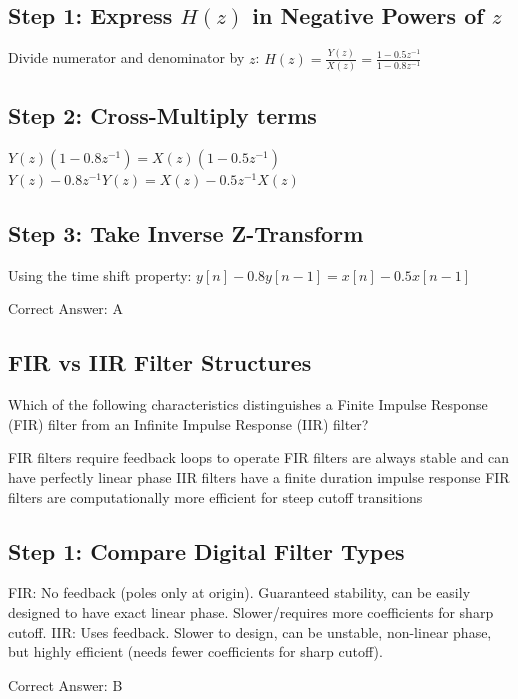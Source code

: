 \begin{solution}

\subsection*{Step 1: Express $H(z)$ in Negative Powers of $z$}
Divide numerator and denominator by $z$:
$H(z) = \frac{Y(z)}{X(z)} = \frac{1 - 0.5 z^{-1}}{1 - 0.8 z^{-1}}$

\subsection*{Step 2: Cross-Multiply terms}
$Y(z)(1 - 0.8 z^{-1}) = X(z)(1 - 0.5 z^{-1})$
$Y(z) - 0.8 z^{-1} Y(z) = X(z) - 0.5 z^{-1} X(z)$

\subsection*{Step 3: Take Inverse Z-Transform}
Using the time shift property:
$y[n] - 0.8 y[n-1] = x[n] - 0.5 x[n-1]$

Correct Answer: A
\end{solution}

\clearpage

\subsection{FIR vs IIR Filter Structures}

Which of the following characteristics distinguishes a Finite Impulse Response (FIR) filter from an Infinite Impulse Response (IIR) filter?

\begin{choices}
    \choice FIR filters require feedback loops to operate
    \correctchoice FIR filters are always stable and can have perfectly linear phase
    \choice IIR filters have a finite duration impulse response
    \choice FIR filters are computationally more efficient for steep cutoff transitions
\end{choices}

\begin{solution}

\subsection*{Step 1: Compare Digital Filter Types}
FIR: No feedback (poles only at origin). Guaranteed stability, can be easily designed to have exact linear phase. Slower/requires more coefficients for sharp cutoff.
IIR: Uses feedback. Slower to design, can be unstable, non-linear phase, but highly efficient (needs fewer coefficients for sharp cutoff).

Correct Answer: B
\end{solution}

